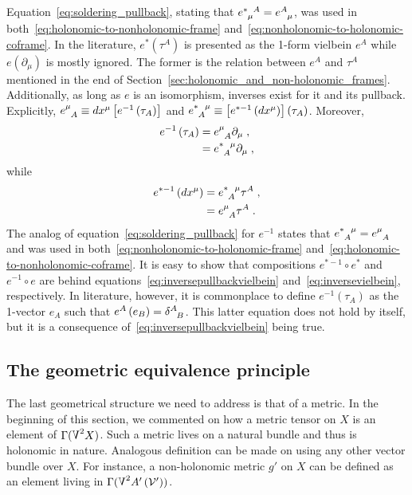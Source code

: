 \documentclass[../../main.tex]{subfiles}
\begin{document}
Equation~\eqref{eq:soldering_pullback}, stating that $\tensor{e}{^*_\mu^A}=\tensor{e}{^A_\mu}$, was used in both~\eqref{eq:holonomic-to-nonholonomic-frame} and~\eqref{eq:nonholonomic-to-holonomic-coframe}. In the literature, $e^*\left(\tau^A\right)$ is presented as the 1-form vielbein $e^A$ while $e\left(\partial_\mu\right)$ is mostly ignored. The former is the  relation between $e^A$ and $\tau^A$ mentioned in the end of Section~\ref{sec:holonomic_and_non-holonomic_frames}. Additionally, as long as $e$ is an isomorphism, inverses exist for it and its pullback. Explicitly, $\tensor{e}{^\mu_A}\equiv dx^\mu\left[e^{-1}\left(\tau_A\right)\right]$ and $\tensor{e}{^*_A^\mu}\equiv \left[e^{*-1}\left(dx^\mu\right)\right]\left(\tau_A\right)$. Moreover,
\begin{align}
  \label{eq:nonholonomic-to-holonomic-frame}
  e^{-1} \left(\tau_A\right) & = \tensor{e}{^\mu_A}\partial_\mu \;,\nonumber \\
                             & = \tensor{e}{^*_A^\mu}\partial_\mu \;,
\end{align}
while
\begin{align}
  \label{eq:holonomic-to-nonholonomic-coframe}
  e^{*-1} \left(dx^\mu\right) & = \tensor{e}{^*_A^\mu}\tau^A \;,\nonumber \\
                              & = \tensor{e}{^\mu_A}\tau^A \;.
\end{align}
The analog of equation~\eqref{eq:soldering_pullback} for $e^{-1}$ states that $\tensor{e}{^*_A^\mu}=\tensor{e}{^\mu_A}$ and was used in both~\eqref{eq:nonholonomic-to-holonomic-frame} and~\eqref{eq:holonomic-to-nonholonomic-coframe}. It is easy to show that compositions $e^{*-1}\circ e^*$ and $e^{-1}\circ e$ are behind equations~\eqref{eq:inversepullbackvielbein} and~\eqref{eq:inversevielbein}, respectively. In literature, however, it is commonplace to define $e^{-1}\left(\tau_A\right)$ as the 1-vector $e_A$ such that $e^A \left(e_B\right)=\tensor{\delta}{^A_B}$. This latter equation does not hold by itself, but it is a consequence of~\eqref{eq:inversepullbackvielbein} being true.

\subsection{The geometric equivalence principle}\label{ssec:the_equivalence_principle}

The last geometrical structure we need to address is that of a metric. In the beginning of this section, we commented on how a metric tensor on $X$ is an element of $\Gamma (\text{\raisebox{\depth}{\scalebox{1}[-1]{$\Lambda$}}}^2 X)$. Such a metric lives on a natural bundle and thus is holonomic in nature. Analogous definition can be made on using any other vector bundle over $X$. For instance, a non-holonomic metric $g'$ on $X$ can be defined as an element living in $\Gamma (\text{\raisebox{\depth}{\scalebox{1}[-1]{$\Lambda$}}}^2A'\left(\mathcal{V}'\right))$.
\end{document}
